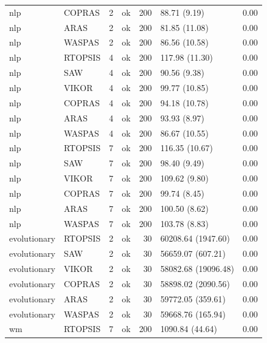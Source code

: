 \begin{table}[htbp]
\begin{tabular}{llrlrlr}
nlp & COPRAS & 2 & ok & 200 & 88.71 (9.19) & 0.00 \\
nlp & ARAS & 2 & ok & 200 & 81.85 (11.08) & 0.00 \\
nlp & WASPAS & 2 & ok & 200 & 86.56 (10.58) & 0.00 \\
nlp & RTOPSIS & 4 & ok & 200 & 117.98 (11.30) & 0.00 \\
nlp & SAW & 4 & ok & 200 & 90.56 (9.38) & 0.00 \\
nlp & VIKOR & 4 & ok & 200 & 99.77 (10.85) & 0.00 \\
nlp & COPRAS & 4 & ok & 200 & 94.18 (10.78) & 0.00 \\
nlp & ARAS & 4 & ok & 200 & 93.93 (8.97) & 0.00 \\
nlp & WASPAS & 4 & ok & 200 & 86.67 (10.55) & 0.00 \\
nlp & RTOPSIS & 7 & ok & 200 & 116.35 (10.67) & 0.00 \\
nlp & SAW & 7 & ok & 200 & 98.40 (9.49) & 0.00 \\
nlp & VIKOR & 7 & ok & 200 & 109.62 (9.80) & 0.00 \\
nlp & COPRAS & 7 & ok & 200 & 99.74 (8.45) & 0.00 \\
nlp & ARAS & 7 & ok & 200 & 100.50 (8.62) & 0.00 \\
nlp & WASPAS & 7 & ok & 200 & 103.78 (8.83) & 0.00 \\
evolutionary & RTOPSIS & 2 & ok & 30 & 60208.64 (1947.60) & 0.00 \\
evolutionary & SAW & 2 & ok & 30 & 56659.07 (607.21) & 0.00 \\
evolutionary & VIKOR & 2 & ok & 30 & 58082.68 (19096.48) & 0.00 \\
evolutionary & COPRAS & 2 & ok & 30 & 58898.02 (2090.56) & 0.00 \\
evolutionary & ARAS & 2 & ok & 30 & 59772.05 (359.61) & 0.00 \\
evolutionary & WASPAS & 2 & ok & 30 & 59668.76 (165.94) & 0.00 \\
wm & RTOPSIS & 7 & ok & 200 & 1090.84 (44.64) & 0.00 \\
\bottomrule
\end{tabular}
\end{table}
